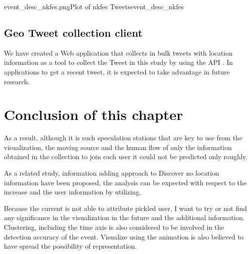 {event_desc_nkfes.png}{Plot of nkfes Tweets}{event_desc_nkfes}

\subsection{Geo Tweet collection client}
We have created a Web application that collects in bulk tweets with location information as a tool to collect the Tweet in this study by using the API .
In applications to get a recent tweet, it is expected to take advantage in future research.

\section{Conclusion of this chapter}

As a result, although it is such speculation stations that are key to use from the visualization, the moving source and the human flow of only the information obtained in the collection to join each user it could not be predicted only roughly.

As a related study, information adding approach to Discover no location information have been proposed\cite{twitterlocalevent}, the analysis can be expected with respect to the increase and the user information by utilizing.

Because the current is not able to attribute pickled user, I want to try or not find any significance in the visualization in the future and the additional information.
Clustering, including the time axis is also considered to be involved in the detection accuracy of the event. Visualize using the animation is also believed to have spread the possibility of representation.

\newpage
